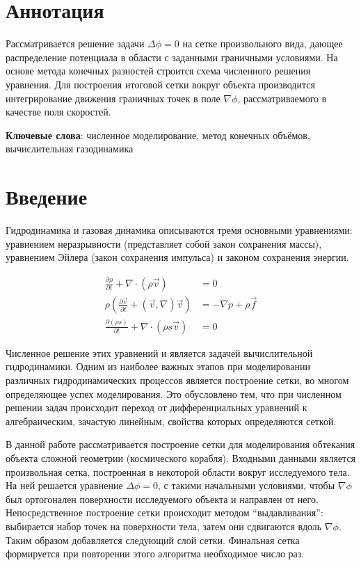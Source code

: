 \documentclass[a4paper,12pt]{article}
\begin{document}


\section*{Аннотация}

Рассматривается решение задачи $\Delta \phi = 0$ на сетке произвольного вида, дающее распределение потенциала в области с заданными граничными условиями. На основе метода конечных разностей строится схема численного решения уравнения. Для построения итоговой сетки вокруг объекта производится интегрирование движения граничных точек в поле $\nabla \phi$, рассматриваемого в качестве поля скоростей.

\textbf{Ключевые слова}: численное моделирование, метод конечных объёмов, вычислительная газодинамика

\section{Введение}

Гидродинамика и газовая динамика описываются тремя основными уравнениями: уравнением неразрывности (представляет собой закон сохранения массы), уравнением Эйлера (закон сохранения импульса) и законом сохранения энергии.

\begin{align}
    \frac{\partial \rho}{\partial t} + \nabla \cdot \left( \rho \vec v \right) &= 0 \\
    \rho \left( \frac{\partial \vec v}{\partial t} + (\vec v, \nabla) \vec v \right) &= - \nabla p + \rho \vec f \\
    \frac{\partial (\rho s)}{\partial t} + \nabla \cdot (\rho s \vec v) &= 0
\end{align}

Численное решение этих уравнений и является задачей вычислительной гидродинамики. Одним из наиболее важных этапов при моделировании различных гидродинамических процессов является построение сетки, во многом определяющее успех моделирования.  Это обусловлено тем, что при численном решении задач происходит переход от дифференциальных уравнений к алгебраическим, зачастую линейным, свойства которых определяются сеткой.

В данной работе рассматривается построение сетки для моделирования обтекания объекта сложной геометрии (космического корабля). Входными данными является произвольная сетка, построенная в некоторой области вокруг исследуемого тела. На ней решается уравнение $\Delta \phi = 0$, с такими начальными условиями, чтобы $\nabla \phi$ был ортогонален поверхности исследуемого объекта и направлен от него. Непосредственное построение сетки происходит методом “выдавливания”: выбирается набор точек на поверхности тела, затем они сдвигаются вдоль $\nabla \phi$. Таким образом добавляется следующий слой сетки. Финальная сетка формируется при повторении этого алгоритма необходимое число раз.
\end{document}
